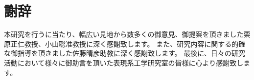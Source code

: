 \chapter{謝辞}
本研究を行うに当たり、幅広い見地から数多くの御意見、御提案を頂きました栗原正仁教授、小山聡准教授に深く感謝致します。
また、研究内容に関する的確な御指導を頂きました佐藤晴彦助教に深く感謝致します。
最後に、日々の研究活動において様々に御助言を頂いた表現系工学研究室の皆様に心より感謝致します。
